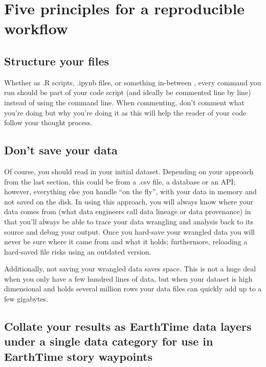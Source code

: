 \documentclass[
]{krantz}
\begin{document}
\hypertarget{five-principles-for-a-reproducible-workflow}{%
\section{Five principles for a reproducible workflow}\label{five-principles-for-a-reproducible-workflow}}

\hypertarget{structure-your-files}{%
\subsection*{Structure your files}\label{structure-your-files}}


Whether as .R scripts, .ipynb files, or something in-between , every command you run should be part of your code script (and ideally be commented line by line) instead of using the command line. When commenting, don't comment what you're doing but why you're doing it as this will help the reader of your code follow your thought process.

\hypertarget{dont-save-your-data}{%
\subsection*{Don't save your data}\label{dont-save-your-data}}


Of course, you should read in your initial dataset. Depending on your approach from the last section, this could be from a .csv file, a database or an API; however, everything else you handle ``on the fly'', with your data in memory and not saved on the disk. In using this approach, you will always know where your data comes from (what data engineers call data lineage or data provenance) in that you'll always be able to trace your data wrangling and analysis back to its source and debug your output. Once you hard-save your wrangled data you will never be sure where it came from and what it holds; furthermore, reloading a hard-saved file risks using an outdated version.

Additionally, not saving your wrangled data saves space. This is not a huge deal when you only have a few hundred lines of data, but when your dataset is high dimensional and holds several million rows your data files can quickly add up to a few gigabytes.

\hypertarget{collate-your-results-as-earthtime-data-layers-under-a-single-data-category-for-use-in-earthtime-story-waypoints}{%
\subsection*{Collate your results as EarthTime data layers under a single data category for use in EarthTime story waypoints}\label{collate-your-results-as-earthtime-data-layers-under-a-single-data-category-for-use-in-earthtime-story-waypoints}}
\end{document}
